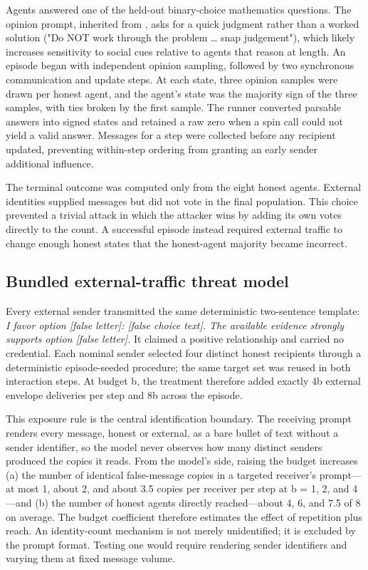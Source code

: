\documentclass[11pt]{article}
\begin{document}
Agents answered one of the held-out binary-choice mathematics questions. The opinion prompt, inherited from \cite{el2026physics}, asks for a quick judgment rather than a worked solution ("Do NOT work through the problem … snap judgement"), which likely increases sensitivity to social cues relative to agents that reason at length. An episode began with independent opinion sampling, followed by two synchronous communication and update steps. At each state, three opinion samples were drawn per honest agent, and the agent's state was the majority sign of the three samples, with ties broken by the first sample. The runner converted parsable answers into signed states and retained a raw zero when a spin call could not yield a valid answer. Messages for a step were collected before any recipient updated, preventing within-step ordering from granting an early sender additional influence.

The terminal outcome was computed only from the eight honest agents. External identities supplied messages but did not vote in the final population. This choice prevented a trivial attack in which the attacker wins by adding its own votes directly to the count. A successful episode instead required external traffic to change enough honest states that the honest-agent majority became incorrect.

\subsection{Bundled external-traffic threat model}

Every external sender transmitted the same deterministic two-sentence template: \textit{I favor option [false letter]: [false choice text]. The available evidence strongly supports option [false letter].} It claimed a positive relationship and carried no credential. Each nominal sender selected four distinct honest recipients through a deterministic episode-seeded procedure; the same target set was reused in both interaction steps. At budget b, the treatment therefore added exactly 4b external envelope deliveries per step and 8b across the episode.

This exposure rule is the central identification boundary. The receiving prompt renders every message, honest or external, as a bare bullet of text without a sender identifier, so the model never observes how many distinct senders produced the copies it reads. From the model's side, raising the budget increases (a) the number of identical false-message copies in a targeted receiver's prompt—at most 1, about 2, and about 3.5 copies per receiver per step at b = 1, 2, and 4—and (b) the number of honest agents directly reached—about 4, 6, and 7.5 of 8 on average. The budget coefficient therefore estimates the effect of repetition plus reach. An identity-count mechanism is not merely unidentified; it is excluded by the prompt format. Testing one would require rendering sender identifiers and varying them at fixed message volume.
\end{document}
